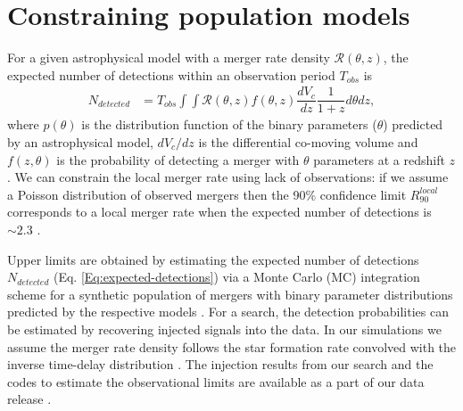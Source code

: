 \documentclass[floatfix,lengthcheck,showpacs,amssymb,amsmath,amsfonts,twocolumn,nofootinbib,longbibliography]{revtex4-1}
\begin{document}
\section{Constraining population models}

For a given astrophysical model with a merger rate density $\mathcal{R}(\theta, z)$, the expected number of detections within an observation period $T_{obs}$ is 
\begin{align}
    N_{detected} & = T_{obs} \int \int \mathcal{R}(\theta,z) f(\theta,z) \dfrac{dV_c}{dz}\dfrac{1}{1+z} d\theta dz ,
    \label{Eq:expected-detections}
\end{align}
where $p(\theta)$ is the distribution function of the binary parameters ($\theta$) predicted by an astrophysical model, $dV_c/dz$ is the differential co-moving volume and $f(z,\theta)$ is the probability of detecting a merger with $\theta$ parameters at a redshift $z$. We can constrain the local merger rate using lack of observations: if we assume a Poisson distribution of observed mergers then the 90\% confidence limit $R_{90}^{local}$ corresponds to a local merger rate when the expected number of detections is $\sim 2.3$ \cite{Biswas:2007ni}.


Upper limits are obtained by estimating the expected number of detections $N_{detected}$ (Eq. \ref{Eq:expected-detections}) via a Monte Carlo (MC) integration scheme for a synthetic population of mergers with binary parameter distributions predicted by the respective models \cite{Tiwari:2017ndi}. For a search, the detection probabilities can be estimated by recovering injected signals into the data. In our simulations we assume the merger rate density follows the star formation rate \cite{Madau:2016jbv} convolved with the inverse time-delay distribution \cite{Zhu:2020ffa}. The injection results from our search and the codes to estimate the observational limits are available as a part of our data release \cite{github}.  
\end{document}
